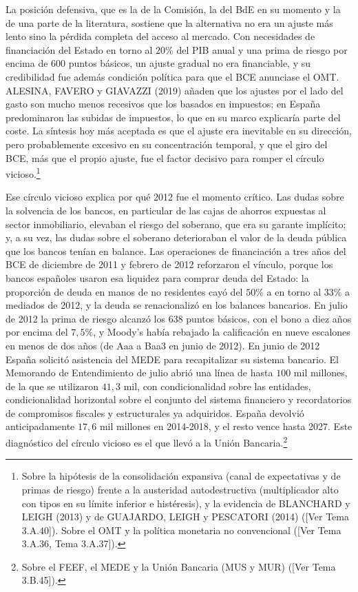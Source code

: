 \documentclass[10pt,a4paper]{article}
\newcommand{\authorfont}[1]{{\fontfamily{EBGaramond-TLF}\selectfont #1}}
\begin{document}
La posición defensiva, que es la de la Comisión, la del BdE en su momento y la de una parte de la literatura, sostiene que la alternativa no era un ajuste más lento sino la pérdida completa del acceso al mercado. Con necesidades de financiación del Estado en torno al $20\%$ del PIB anual y una prima de riesgo por encima de $600$ puntos básicos, un ajuste gradual no era financiable, y su credibilidad fue además condición política para que el BCE anunciase el OMT. ALESINA, FAVERO y GIAVAZZI (2019) añaden que los ajustes por el lado del gasto son mucho menos recesivos que los basados en impuestos; en España predominaron las subidas de impuestos, lo que en su marco explicaría parte del coste. La síntesis hoy más aceptada es que el ajuste era inevitable en su dirección, pero probablemente excesivo en su concentración temporal, y que el giro del BCE, más que el propio ajuste, fue el factor decisivo para romper el círculo vicioso.\footnote{%
    Sobre la hipótesis de la consolidación expansiva (canal de expectativas y de primas de riesgo) frente a la austeridad autodestructiva (multiplicador alto con tipos en su límite inferior e histéresis), y la evidencia de BLANCHARD y LEIGH (2013) y de GUAJARDO, LEIGH y PESCATORI (2014) ([\authorfont{Ver Tema 3.A.40}]). Sobre el OMT y la política monetaria no convencional ([\authorfont{Ver Tema 3.A.36, Tema 3.A.37}]).
}

Ese círculo vicioso explica por qué 2012 fue el momento crítico. Las dudas sobre la solvencia de los bancos, en particular de las cajas de ahorros expuestas al sector inmobiliario, elevaban el riesgo del soberano, que era su garante implícito; y, a su vez, las dudas sobre el soberano deterioraban el valor de la deuda pública que los bancos tenían en balance. Las operaciones de financiación a tres años del BCE de diciembre de 2011 y febrero de 2012 reforzaron el vínculo, porque los bancos españoles usaron esa liquidez para comprar deuda del Estado: la proporción de deuda en manos de no residentes cayó del $50\%$ a en torno al $33\%$ a mediados de 2012, y la deuda se renacionalizó en los balances bancarios. En julio de 2012 la prima de riesgo alcanzó los $638$ puntos básicos, con el bono a diez años por encima del $7,5\%$, y Moody's había rebajado la calificación en nueve escalones en menos de dos años (de Aaa a Baa3 en junio de 2012). En junio de 2012 España solicitó asistencia del MEDE para recapitalizar su sistema bancario. El Memorando de Entendimiento de julio abrió una línea de hasta $100$ mil millones, de la que se utilizaron $41,3$ mil, con condicionalidad sobre las entidades, condicionalidad horizontal sobre el conjunto del sistema financiero y recordatorios de compromisos fiscales y estructurales ya adquiridos. España devolvió anticipadamente $17,6$ mil millones en 2014-2018, y el resto vence hasta 2027. Este diagnóstico del círculo vicioso es el que llevó a la Unión Bancaria.\footnote{%
    Sobre el FEEF, el MEDE y la Unión Bancaria (MUS y MUR) ([\authorfont{Ver Tema 3.B.45}]).
}
\end{document}
